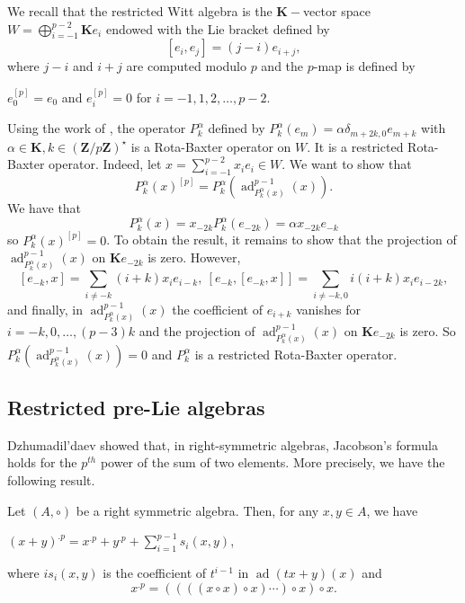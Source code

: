 \documentclass[11pt, twoside]{article}
\DeclareMathOperator{\ad}{ad}
\begin{document}
\begin{ex}
We recall that the restricted Witt algebra is the $\mathbf{K}- $vector space $W=\bigoplus\limits_{i=-1}^{p-2}\mathbf{K}e_i $ endowed with the Lie bracket defined by $$[e_i,e_j]=(j-i)e_{i+j}, $$ where $j-i $ and $i+j $ are computed modulo $p$ and the $p$-map is defined by \begin{center}
    $e_0^{[p]}=e_0$ and $e_i^{[p]}=0 $ for $i= -1,1,2,\ldots, p-2$.
\end{center}  
   Using the work of \cite{GLBJ16}, the operator $P_k^\alpha$ defined by $P_k^\alpha(e_m)=\alpha\delta_{m+2k,0}e_{m+k} $ with $\alpha\in \mathbf{K},k\in (\mathbf{Z}/p\mathbf{Z})^\star $ is a Rota-Baxter operator on $W$. It is a restricted Rota-Baxter operator. Indeed, let $x= \sum\limits_{i=-1}^{p-2}x_i e_i\in W $. We want to show that $$P_k^\alpha(x)^{[p]}= P_k^\alpha(\ad_{P_k^\alpha(x)}^{p-1}(x)). $$ We have that $$P_k^\alpha(x)= x_{-2k}P_k^\alpha(e_{-2k})= \alpha x_{-2k}e_{-k} $$ so $P_k^\alpha(x)^{[p]}=0 $. To obtain the result, it remains to show that the projection of $\ad_{P_k^\alpha(x)}^{p-1}(x) $ on $\mathbf{K}e_{-2k} $ is zero. However, $$[e_{-k},x]= \sum\limits_{i\neq -k}(i+k) x_ie_{i-k} ,\  [e_{-k},[e_{-k},x]]=\sum\limits_{i\neq -k,0}i(i+k)x_ie_{i-2k}, $$ and finally, in $\ad_{P_k^\alpha(x)}^{p-1}(x) $ the coefficient of $e_{i+k}$ vanishes for $i=-k,0,\ldots,(p-3)k$ and the projection of $\ad_{P_k^\alpha(x)}^{p-1}(x) $ on $\mathbf{K}e_{-2k} $ is zero. So $P_k^\alpha(\ad_{P_k^\alpha(x)}^{p-1}(x))=0 $ and $P_k^\alpha$ is a restricted Rota-Baxter operator.
\end{ex}

\subsection{Restricted pre-Lie algebras}


Dzhumadil'daev showed that, in right-symmetric algebras, Jacobson's formula holds for the $p^{th}$ power of the sum of two elements. More precisely, we have the following result.

\begin{prop}[\cite{D01}]
    Let $(A,\circ) $ be a right symmetric algebra. Then, for any $x,y\in A$, we have \begin{center}
        $(x+y)^{.p}= x^{.p}+ y^{.p} + \sum\limits_{i=1}^{p-1} s_i(x,y) $,
    \end{center} where $is_i(x,y) $ is the coefficient of $t^{i-1} $ in $\ad(tx+y)(x) $ and $$x^{.p}= ((((x\circ x)\circ x)\cdots)\circ x)\circ x. $$
\end{prop}
\end{document}
